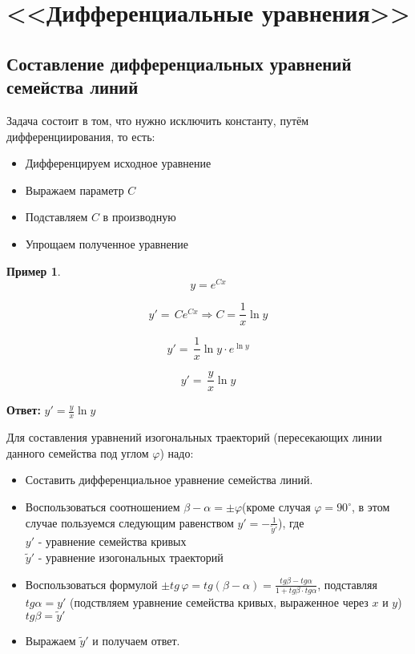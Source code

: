 \documentclass[a4paper, 14pt]{article}
\renewcommand{\phi}{\varphi}
\theoremstyle{definition}
\newtheorem*{example}{Пример}
\newenvironment{answer}
  {\par\noindent\textbf{Ответ:}}
  {\par}
\begin{document}
\section{<<Дифференциальные уравнения>>}

\subsection{Составление дифференциальных уравнений семейства линий}

Задача состоит в том, что нужно исключить константу, путём дифференциирования, то есть:

\begin{itemize}
\item \textbf{} Дифференцируем исходное уравнение
\item \textbf{} Выражаем параметр $C$
\item \textbf{} Подставляем $C$ в производную
\item \textbf{} Упрощаем полученное уравнение
\end{itemize}

\begin{example}

\[y = e^{Cx}\]

\[y' =\, C e^{Cx} \Longrightarrow C = \frac{1}{x}\ln{y}\]

\[y' =\,\frac{1}{x}\ln{y} \cdot e^{\ln{y}}\]

\[y' =\,\frac{y}{x}\ln{y}\]
\end{example}
\begin{answer}
$y' =\frac{y}{x}\ln{y}$
\end{answer} 

\medskip

Для составления уравнений изогональных траекторий (пересекающих линии данного семейства под углом $\phi$) надо:

\begin{itemize}
\item \textbf{} Составить дифференциальное уравнение семейства линий.
\item \textbf{} Воспользоваться соотношением $\beta - \alpha = \pm \phi$(кроме случая $\phi = 90^{\circ}$, в этом случае пользуемся следующим равенством $y' = -\frac{1}{\tilde{y}'}$), где \\
$y'$ - уравнение семейства кривых\\
$\tilde{y}'$ - уравнение изогональных траекторий
\item \textbf{} Воспользоваться формулой $\pm tg{ \,\phi} = tg{(\beta - \alpha)} = \frac{tg{\beta} - tg{\alpha}}{1 + tg{\beta}\cdot tg{\alpha}}$, подставляя \\
$tg{\alpha} = y'$ (подствляем уравнение семейства кривых, выраженное через $x$ и $y$)\\
$tg{\beta} = \tilde{y}'$
\item \textbf{}Выражаем $\tilde{y}'$ и получаем ответ.
\end{itemize}
\end{document}
